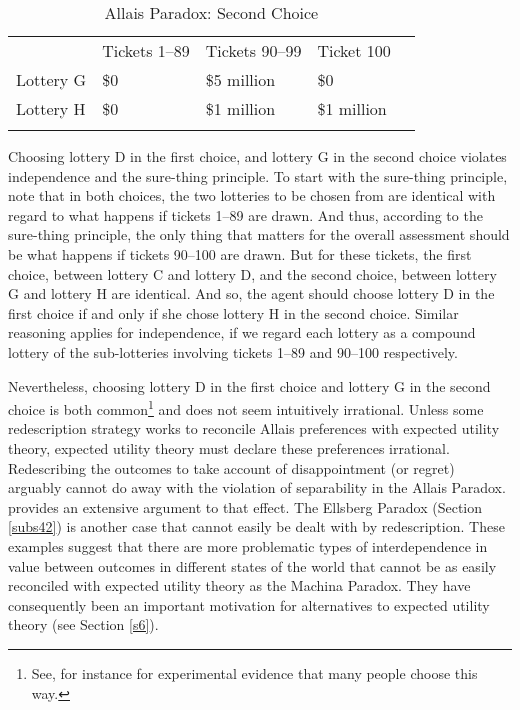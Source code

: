 \begin{table}[ht]
\centering
\begin{tabular}{lllll}
\cline{2-4}
\multicolumn{1}{l|}{}           & \multicolumn{1}{l|}{Tickets 1--89} & \multicolumn{1}{l|}{Tickets 90--99} & \multicolumn{1}{l|}{Ticket 100}  &  \\ \cline{1-4}
\multicolumn{1}{|l|}{Lottery G} & \multicolumn{1}{l|}{\$0}    & \multicolumn{1}{l|}{\$5 million}     & \multicolumn{1}{l|}{\$0}         &  \\ \cline{1-4}
\multicolumn{1}{|l|}{Lottery H} & \multicolumn{1}{l|}{\$0}    & \multicolumn{1}{l|}{\$1 million}     & \multicolumn{1}{l|}{\$1 million} &  \\ \cline{1-4}
                                &                                     &                                      &                                  &
\end{tabular}
\caption{Allais Paradox: Second Choice}
\label{t7}
\end{table}

Choosing lottery D in the first choice, and lottery G in the second choice violates independence and the sure-thing principle. To start with the sure-thing principle, note that in both choices, the two lotteries to be chosen from are identical with regard to what happens if tickets 1--89 are drawn. And thus, according to the sure-thing principle, the only thing that matters for the overall assessment should be what happens if tickets 90--100 are drawn. But for these tickets, the first choice, between lottery C and lottery D, and the second choice, between lottery G and lottery H are identical. And so, the agent should choose lottery D in the first choice if and only if she chose lottery H in the second choice. Similar reasoning applies for independence, if we regard each lottery as a compound lottery of the sub-lotteries involving tickets 1--89 and 90--100 respectively.

Nevertheless, choosing lottery D in the first choice and lottery G in the second choice is both common\footnote{See, for instance \citet{Morrison1967} for experimental evidence that many people choose this way.} and does not seem intuitively irrational. Unless some redescription strategy works to reconcile Allais preferences with expected utility theory, expected utility theory must declare these preferences irrational. Redescribing the outcomes to take account of disappointment (or regret) arguably cannot do away with the violation of separability in the Allais Paradox. \citet{Weber1998} provides an extensive argument to that effect. The Ellsberg Paradox (Section \ref{subs42}) is another case that cannot easily be dealt with by redescription. These examples suggest that there are more problematic types of interdependence in value between outcomes in different states of the world that cannot be as easily reconciled with expected utility theory as the Machina Paradox. They have consequently been an important motivation for alternatives to expected utility theory (see Section \ref{s6}).

